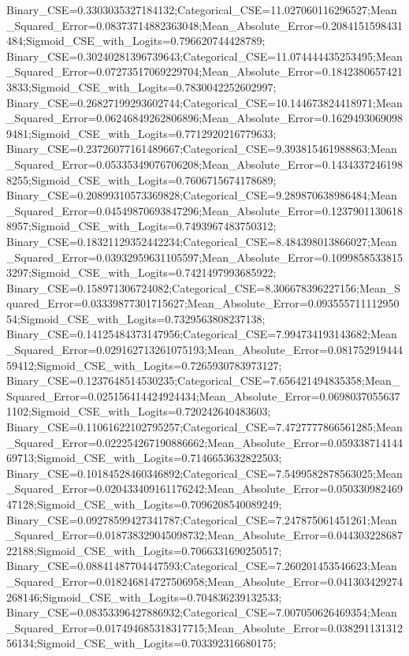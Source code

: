 Binary_CSE=0.3303035327184132;Categorical_CSE=11.027060116296527;Mean_Squared_Error=0.08373714882363048;Mean_Absolute_Error=0.2084151598431484;Sigmoid_CSE_with_Logits=0.796620744428789;
Binary_CSE=0.30240281396739643;Categorical_CSE=11.074444435253495;Mean_Squared_Error=0.07273517069229704;Mean_Absolute_Error=0.18423806574213833;Sigmoid_CSE_with_Logits=0.7830042252602997;
Binary_CSE=0.26827199293602744;Categorical_CSE=10.144673824418971;Mean_Squared_Error=0.06246849262806896;Mean_Absolute_Error=0.16294930690989481;Sigmoid_CSE_with_Logits=0.7712920216779633;
Binary_CSE=0.23726077161489667;Categorical_CSE=9.393815461988863;Mean_Squared_Error=0.05335349076706208;Mean_Absolute_Error=0.14343372461988255;Sigmoid_CSE_with_Logits=0.7606715674178689;
Binary_CSE=0.20899310573369828;Categorical_CSE=9.289870638986484;Mean_Squared_Error=0.04549870693847296;Mean_Absolute_Error=0.12379011306188957;Sigmoid_CSE_with_Logits=0.7493967483750312;
Binary_CSE=0.18321129352442234;Categorical_CSE=8.484398013866027;Mean_Squared_Error=0.03932959631105597;Mean_Absolute_Error=0.10998585338153297;Sigmoid_CSE_with_Logits=0.7421497993685922;
Binary_CSE=0.158971306724082;Categorical_CSE=8.306678396227156;Mean_Squared_Error=0.03339877301715627;Mean_Absolute_Error=0.09355571111295054;Sigmoid_CSE_with_Logits=0.7329563808237138;
Binary_CSE=0.14125484373147956;Categorical_CSE=7.994734193143682;Mean_Squared_Error=0.029162713261075193;Mean_Absolute_Error=0.08175291944459412;Sigmoid_CSE_with_Logits=0.7265930783973127;
Binary_CSE=0.1237648514530235;Categorical_CSE=7.656421494835358;Mean_Squared_Error=0.025156414424924434;Mean_Absolute_Error=0.06980370556371102;Sigmoid_CSE_with_Logits=0.720242640483603;
Binary_CSE=0.11061622102795257;Categorical_CSE=7.4727777866561285;Mean_Squared_Error=0.022254267190886662;Mean_Absolute_Error=0.05933871414469713;Sigmoid_CSE_with_Logits=0.7146653632822503;
Binary_CSE=0.10184528460346892;Categorical_CSE=7.5499582878563025;Mean_Squared_Error=0.020433409161176242;Mean_Absolute_Error=0.05033098246947128;Sigmoid_CSE_with_Logits=0.7096208540089249;
Binary_CSE=0.09278599427341787;Categorical_CSE=7.247875061451261;Mean_Squared_Error=0.018738329045098732;Mean_Absolute_Error=0.04430322868722188;Sigmoid_CSE_with_Logits=0.7066331690250517;
Binary_CSE=0.08841487704447593;Categorical_CSE=7.260201453546623;Mean_Squared_Error=0.018246814727506958;Mean_Absolute_Error=0.041303429274268146;Sigmoid_CSE_with_Logits=0.704836239132533;
Binary_CSE=0.08353396427886932;Categorical_CSE=7.007050626469354;Mean_Squared_Error=0.017494685318317715;Mean_Absolute_Error=0.03829113131256134;Sigmoid_CSE_with_Logits=0.703392316680175;
